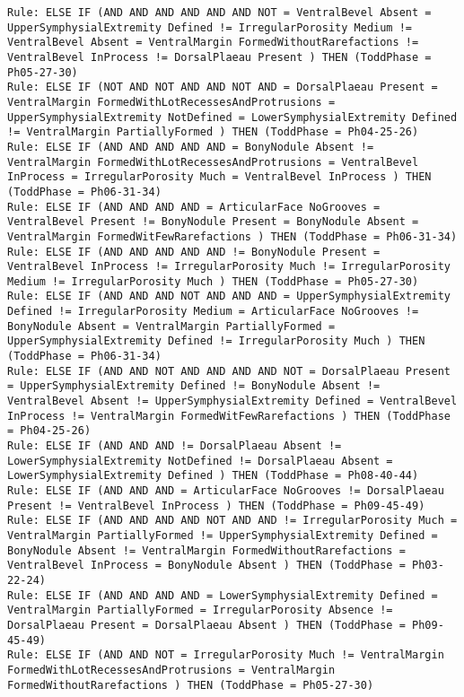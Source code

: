 \begin{lstlisting}
Rule: ELSE IF (AND AND AND AND AND AND NOT = VentralBevel Absent = UpperSymphysialExtremity Defined != IrregularPorosity Medium != VentralBevel Absent = VentralMargin FormedWithoutRarefactions != VentralBevel InProcess != DorsalPlaeau Present ) THEN (ToddPhase = Ph05-27-30)
Rule: ELSE IF (NOT AND NOT AND AND NOT AND = DorsalPlaeau Present = VentralMargin FormedWithLotRecessesAndProtrusions = UpperSymphysialExtremity NotDefined = LowerSymphysialExtremity Defined != VentralMargin PartiallyFormed ) THEN (ToddPhase = Ph04-25-26)
Rule: ELSE IF (AND AND AND AND AND = BonyNodule Absent != VentralMargin FormedWithLotRecessesAndProtrusions = VentralBevel InProcess = IrregularPorosity Much = VentralBevel InProcess ) THEN (ToddPhase = Ph06-31-34)
Rule: ELSE IF (AND AND AND AND = ArticularFace NoGrooves = VentralBevel Present != BonyNodule Present = BonyNodule Absent = VentralMargin FormedWitFewRarefactions ) THEN (ToddPhase = Ph06-31-34)
Rule: ELSE IF (AND AND AND AND AND != BonyNodule Present = VentralBevel InProcess != IrregularPorosity Much != IrregularPorosity Medium != IrregularPorosity Much ) THEN (ToddPhase = Ph05-27-30)
Rule: ELSE IF (AND AND AND NOT AND AND AND = UpperSymphysialExtremity Defined != IrregularPorosity Medium = ArticularFace NoGrooves != BonyNodule Absent = VentralMargin PartiallyFormed = UpperSymphysialExtremity Defined != IrregularPorosity Much ) THEN (ToddPhase = Ph06-31-34)
Rule: ELSE IF (AND AND NOT AND AND AND AND NOT = DorsalPlaeau Present = UpperSymphysialExtremity Defined != BonyNodule Absent != VentralBevel Absent != UpperSymphysialExtremity Defined = VentralBevel InProcess != VentralMargin FormedWitFewRarefactions ) THEN (ToddPhase = Ph04-25-26)
Rule: ELSE IF (AND AND AND != DorsalPlaeau Absent != LowerSymphysialExtremity NotDefined != DorsalPlaeau Absent = LowerSymphysialExtremity Defined ) THEN (ToddPhase = Ph08-40-44)
Rule: ELSE IF (AND AND AND = ArticularFace NoGrooves != DorsalPlaeau Present != VentralBevel InProcess ) THEN (ToddPhase = Ph09-45-49)
Rule: ELSE IF (AND AND AND AND NOT AND AND != IrregularPorosity Much = VentralMargin PartiallyFormed != UpperSymphysialExtremity Defined = BonyNodule Absent != VentralMargin FormedWithoutRarefactions = VentralBevel InProcess = BonyNodule Absent ) THEN (ToddPhase = Ph03-22-24)
Rule: ELSE IF (AND AND AND AND = LowerSymphysialExtremity Defined = VentralMargin PartiallyFormed = IrregularPorosity Absence != DorsalPlaeau Present = DorsalPlaeau Absent ) THEN (ToddPhase = Ph09-45-49)
Rule: ELSE IF (AND AND NOT = IrregularPorosity Much != VentralMargin FormedWithLotRecessesAndProtrusions = VentralMargin FormedWithoutRarefactions ) THEN (ToddPhase = Ph05-27-30)

\end{lstlisting}
